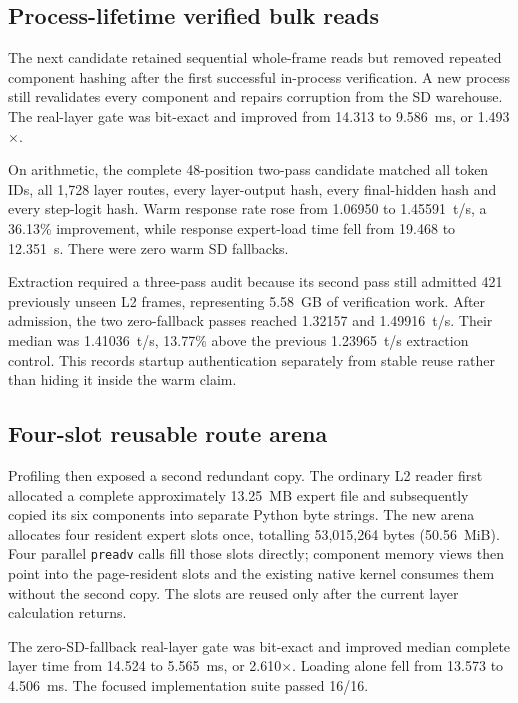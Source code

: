 \subsection{Process-lifetime verified bulk reads}

The next candidate retained sequential whole-frame reads but removed repeated
component hashing after the first successful in-process verification. A new
process still revalidates every component and repairs corruption from the SD
warehouse. The real-layer gate was bit-exact and improved from 14.313 to
9.586~ms, or 1.493$\times$.

On arithmetic, the complete 48-position two-pass candidate matched all token
IDs, all 1,728 layer routes, every layer-output hash, every final-hidden hash
and every step-logit hash. Warm response rate rose from 1.06950 to
1.45591~t/s, a 36.13\% improvement, while response expert-load time fell from
19.468 to 12.351~s. There were zero warm SD fallbacks.

Extraction required a three-pass audit because its second pass still admitted
421 previously unseen L2 frames, representing 5.58~GB of verification work.
After admission, the two zero-fallback passes reached 1.32157 and
1.49916~t/s. Their median was 1.41036~t/s, 13.77\% above the previous
1.23965~t/s extraction control. This records startup authentication
separately from stable reuse rather than hiding it inside the warm claim.

\subsection{Four-slot reusable route arena}

Profiling then exposed a second redundant copy. The ordinary L2 reader first
allocated a complete approximately 13.25~MB expert file and subsequently
copied its six components into separate Python byte strings. The new arena
allocates four resident expert slots once, totalling 53,015,264 bytes
(50.56~MiB). Four parallel \texttt{preadv} calls fill those slots directly;
component memory views then point into the page-resident slots and the existing
native kernel consumes them without the second copy. The slots are reused
only after the current layer calculation returns.

The zero-SD-fallback real-layer gate was bit-exact and improved median complete
layer time from 14.524 to 5.565~ms, or 2.610$\times$. Loading alone fell from
13.573 to 4.506~ms. The focused implementation suite passed 16/16.


